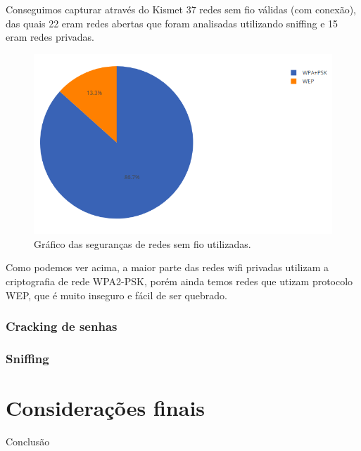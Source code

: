 \documentclass[
	article,			%
	12pt,				%
	oneside,			%
	a4paper,			%
	english,			%
	brazil,				%
	sumario=tradicional
	]{abntex2}
\begin{document}
Conseguimos capturar através do Kismet 37 redes sem fio válidas (com conexão), das quais 22 eram redes abertas que foram analisadas utilizando sniffing e 15 eram redes privadas.

\begin{figure}[H]
	\centering
	\caption{Gráfico das seguranças de redes sem fio utilizadas.}
	\includegraphics[scale=0.7]{graficopie-seguranca-redes}
\end{figure}

Como podemos ver acima, a maior parte das redes wifi privadas utilizam a criptografia de rede WPA2-PSK, porém ainda temos redes que utizam protocolo WEP, que é muito inseguro e fácil de ser quebrado.





\subsubsection{Cracking de senhas}

\subsubsection{Sniffing}


\section*{Considerações finais}

Conclusão

\postextual
\end{document}

